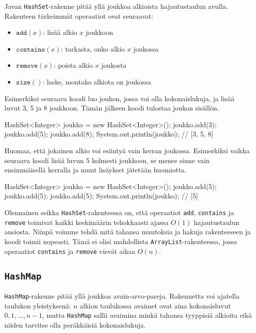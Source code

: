 Javan \texttt{HashSet}-rakenne pitää yllä joukkoa alkioista
hajautustaulun avulla.
Rakenteen tärkeimmät operaatiot ovat seuraavat:

\begin{itemize}
\item $\texttt{add}(x)$: lisää alkio $x$ joukkoon
\item $\texttt{contains}(x)$: tarkasta, onko alkio $x$ joukossa
\item $\texttt{remove}(x)$: poista alkio $x$ joukosta
\item $\texttt{size}()$: laske, montako alkiota on joukossa
\end{itemize}

Esimerkiksi seuraava koodi luo joukon, jossa voi olla
kokonaislukuja, ja lisää luvut 3, 5 ja 8 joukkoon.
Tämän jälkeen koodi tulostaa joukon sisällön.

\begin{code}
HashSet<Integer> joukko = new HashSet<Integer>();
joukko.add(3);
joukko.add(5);
joukko.add(8);
System.out.println(joukko); // [3, 5, 8]
\end{code}

Huomaa, että jokainen alkio voi esiintyä vain kerran joukossa.
Esimerkiksi vaikka seuraava koodi lisää luvun 5 kolmesti
joukkoon, se menee sinne vain ensimmäisellä kerralla ja
muut lisäykset jätetään huomiotta.

\begin{code}
HashSet<Integer> joukko = new HashSet<Integer>();
joukko.add(5);
joukko.add(5);
joukko.add(5);
System.out.println(joukko); // [5]
\end{code}

Olennainen seikka \texttt{HashSet}-rakenteessa on,
että operaatiot \texttt{add}, \texttt{contains} ja \texttt{remove}
toimivat kaikki keskimäärin tehokkaasti ajassa $O(1)$
hajautustaulun ansiosta.
Niinpä voimme tehdä mitä tahansa muutoksia ja hakuja
rakenteeseen ja koodi toimii nopeasti.
Tämä ei olisi mahdollista \texttt{ArrayList}-rakenteessa,
jossa operaatiot \texttt{contains} ja \texttt{remove}
vievät aikaa $O(n)$.

\subsection{\texttt{HashMap}}

\texttt{HashMap}-rakenne pitää yllä joukkoa avain-arvo-pareja.
Rakennetta voi ajatella taulukon yleistyksenä:
$n$ alkion taulukossa avaimet ovat aina kokonaisluvut
$0,1,\ldots,n-1$, mutta \texttt{HashMap} sallii
avaimina minkä tahansa tyyppisiä alkioita eikä niiden
tarvitse olla peräkkäisiä kokonaislukuja.

